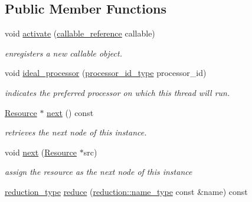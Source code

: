 \subsection*{Public Member Functions}
\begin{DoxyCompactItemize}
\item 
\hypertarget{classhryky_1_1thread_1_1_resource_af9fcef58fcb1994a1d7ec6f298e88802}{void \hyperlink{classhryky_1_1thread_1_1_resource_af9fcef58fcb1994a1d7ec6f298e88802}{activate} (\hyperlink{classhryky_1_1thread_1_1callable_1_1_base}{callable\-\_\-reference} callable)}\label{classhryky_1_1thread_1_1_resource_af9fcef58fcb1994a1d7ec6f298e88802}

\begin{DoxyCompactList}\small\item\em enregisters a new callable object. \end{DoxyCompactList}\item 
void \hyperlink{classhryky_1_1thread_1_1_resource_a2f4409684f911e1ed4b6b22bb6379d65}{ideal\-\_\-processor} (\hyperlink{namespacehryky_a5e2737162aa470ce3920f86e86eac0bc}{processor\-\_\-id\-\_\-type} processor\-\_\-id)
\begin{DoxyCompactList}\small\item\em indicates the preferred processor on which this thread will run. \end{DoxyCompactList}\item 
\hypertarget{classhryky_1_1thread_1_1_resource_a32c89b122cd2eda508a8d1b144da8b8b}{\hyperlink{classhryky_1_1thread_1_1_resource}{Resource} $\ast$ \hyperlink{classhryky_1_1thread_1_1_resource_a32c89b122cd2eda508a8d1b144da8b8b}{next} () const }\label{classhryky_1_1thread_1_1_resource_a32c89b122cd2eda508a8d1b144da8b8b}

\begin{DoxyCompactList}\small\item\em retrieves the next node of this instance. \end{DoxyCompactList}\item 
\hypertarget{classhryky_1_1thread_1_1_resource_a796899f9c95cb3fb66fa30e995acd293}{void \hyperlink{classhryky_1_1thread_1_1_resource_a796899f9c95cb3fb66fa30e995acd293}{next} (\hyperlink{classhryky_1_1thread_1_1_resource}{Resource} $\ast$src)}\label{classhryky_1_1thread_1_1_resource_a796899f9c95cb3fb66fa30e995acd293}

\begin{DoxyCompactList}\small\item\em assign the resource as the next node of this instance \end{DoxyCompactList}\item 
\hypertarget{classhryky_1_1thread_1_1_resource_a7969d2b9cab9fc7e004d0137dec485e3}{\hyperlink{namespacehryky_a343a9a4c36a586be5c2693156200eadc}{reduction\-\_\-type} \hyperlink{classhryky_1_1thread_1_1_resource_a7969d2b9cab9fc7e004d0137dec485e3}{reduce} (\hyperlink{namespacehryky_1_1reduction_ac686c30a4c8d196bbd0f05629a6b921f}{reduction\-::name\-\_\-type} const \&name) const }\label{classhryky_1_1thread_1_1_resource_a7969d2b9cab9fc7e004d0137dec485e3}


\end{DoxyCompactItemize}

